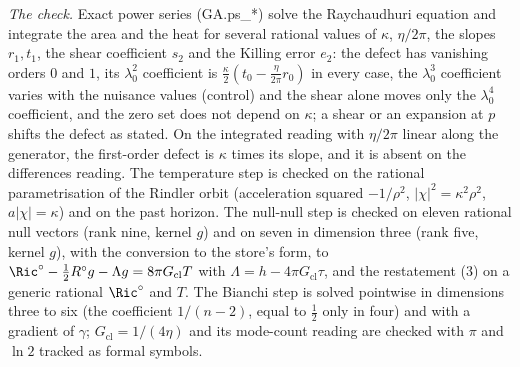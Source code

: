 \emph{The check.} Exact power series (GA.ps\_*) solve the Raychaudhuri equation and integrate the area and the heat for several rational values of $\kappa$, $\eta/2\pi$, the slopes $r_{1}, t_{1}$, the shear coefficient $s_{2}$ and the Killing error $e_{2}$: the defect has vanishing orders $0$ and $1$, its $\lambda_{0}^{2}$ coefficient is $\tfrac{\kappa}{2}(t_{0} - \tfrac{\eta}{2\pi}r_{0})$ in every case, the $\lambda_{0}^{3}$ coefficient varies with the nuisance values (control) and the shear alone moves only the $\lambda_{0}^{4}$ coefficient, and the zero set does not depend on $\kappa$; a shear or an expansion at $p$ shifts the defect as stated. On the integrated reading with $\eta/2\pi$ linear along the generator, the first-order defect is $\kappa$ times its slope, and it is absent on the differences reading. The temperature step is checked on the rational parametrisation of the Rindler orbit (acceleration squared $-1/\rho^{2}$, $|\chi|^{2} = \kappa^{2}\rho^{2}$, $a|\chi| = \kappa$) and on the past horizon. The null-null step is checked on eleven rational null vectors (rank nine, kernel $g$) and on seven in dimension three (rank five, kernel $g$), with the conversion to the store's form, to $\Ric^{\circ} - \tfrac12 R^{\circ}g - \Lambda g = 8\pi G_{\mathrm{cl}}T$ with $\Lambda = h - 4\pi G_{\mathrm{cl}}\tau$, and the restatement (3) on a generic rational $\Ric^{\circ}$ and $T$. The Bianchi step is solved pointwise in dimensions three to six (the coefficient $1/(n-2)$, equal to $\tfrac12$ only in four) and with a gradient of $\gamma$; $G_{\mathrm{cl}} = 1/(4\eta)$ and its mode-count reading are checked with $\pi$ and $\ln 2$ tracked as formal symbols.
